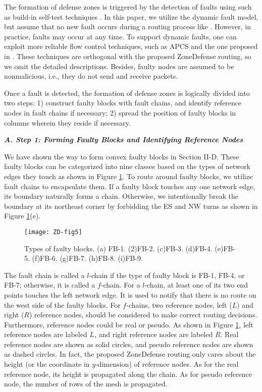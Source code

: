 The formation of defense zones is triggered by the detection of faults using such as build-in self-test techniques \cite{li2001loop}. In this paper, we utilize the dynamic fault model, but assume that no new fault occurs during a routing process like \cite{wu2003fault}. However, in practice, faults may occur at any time. To support dynamic faults, one can exploit more reliable flow control techniques, such as APCS \cite{gaughan1996distributed} and the one proposed in \cite{dao1999dynamically}. These techniques are orthogonal with the proposed ZoneDefense routing, so we omit the detailed descriptions. Besides, faulty nodes are assumed to be nonmalicious, i.e., they do not send and receive packets.


Once a fault is detected, the formation of defense zones is logically divided into two steps:
1) construct faulty blocks with fault chains, and identify reference nodes in fault chains if necessary;
2) spread the position of faulty blocks in columns wherein they reside if necessary.


\textbf{\textit{A. Step 1: Forming Faulty Blocks and Identifying Reference
Nodes}}

We have shown the way to form convex faulty blocks in Section II-D. These faulty blocks can be categorized into nine classes based on the types of network edges they touch as shown in Figure \ref{fig:ZD-fig5}. To route around faulty blocks, we utilize fault chains to encapsulate them. If a faulty block touches any one network edge, its boundary naturally forms a chain. Otherwise, we intentionally break the boundary at its northeast corner by forbidding the ES and NW turns as shown in Figure \ref{fig:ZD-fig5}(e).

\begin{figure}[h]
    \centering
        \texttt{[image: ZD-fig5]}
          \caption{Types of faulty blocks. (a) FB-1. (2)FB-2. (c)FB-3. (d)FB-4. (e)FB-5. (f)FB-6. (g)FB-7. (h)FB-8. (i)FB-9.}
        \label{fig:ZD-fig5}
\end{figure}


The fault chain is called a $l$-chain if the type of faulty block is FB-1, FB-4, or FB-7; otherwise, it is called a $f$-chain. For a $l$-chain, at least one of its two end points touches the left network edge. It is used to notify that there is no route on the west side of the faulty blocks. For $f$-chains, two reference nodes, left ($L$) and right ($R$) reference nodes, should be considered to make correct routing decisions. Furthermore, reference nodes could be real or pseudo. As shown in Figure \ref{fig:ZD-fig5}, left reference nodes are labeled $L$, and right reference nodes are labeled $R$. Real reference nodes are shown as solid circles, and pseudo reference nodes are shown as dashed circles. In fact, the proposed ZoneDefense routing only cares about the height (or the coordinate in $y$-dimension) of reference nodes. As for the real reference node, its height is propagated along the chain. As for pseudo reference node, the number of rows of the mesh is propagated.

